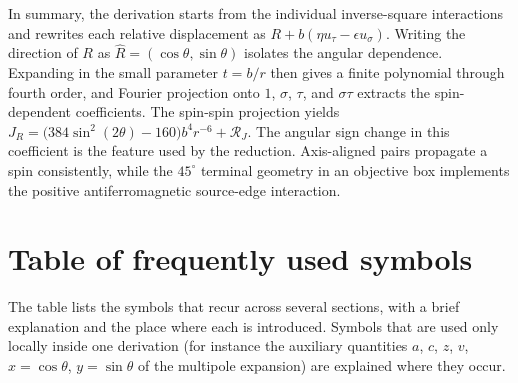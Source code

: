 \documentclass[12pt,a4paper]{article}
\begin{document}
In summary, the derivation starts from the individual inverse-square interactions and rewrites each relative displacement as $R+b(\eta u_\tau-\epsilon u_\sigma)$.  Writing the direction of $R$ as $\widehat R=(\cos\theta,\sin\theta)$ isolates the angular dependence.  Expanding in the small parameter $t=b/r$ then gives a finite polynomial through fourth order, and Fourier projection onto $1$, $\sigma$, $\tau$, and $\sigma\tau$ extracts the spin-dependent coefficients.  The spin-spin projection yields $J_R=\bigl(384\sin^2(2\theta)-160\bigr)b^4r^{-6}+\mathcal R_J$.  The angular sign change in this coefficient is the feature used by the reduction.
Axis-aligned pairs propagate a spin consistently, while the
$45^\circ$ terminal geometry in an objective box implements the
positive antiferromagnetic source-edge interaction.

\section{Table of frequently used symbols}\label{app:symbols}

The table lists the symbols that recur across several sections, with a brief explanation and the place where each is introduced.  Symbols that are used only locally inside one derivation (for instance the auxiliary quantities $a$, $c$, $z$, $v$, $x=\cos\theta$, $y=\sin\theta$ of the multipole expansion) are explained where they occur.
\end{document}

